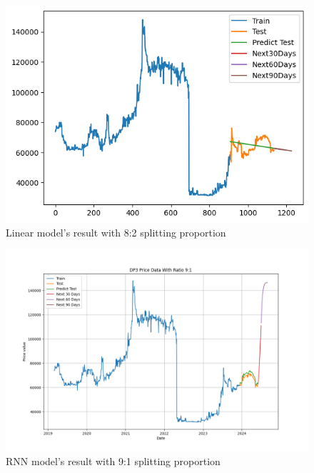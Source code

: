 \documentclass{ieeeojies}
\begin{document}
\begin{figure}[H]
  \centering
  \begin{minipage}{0.8\linewidth}
    \centering
    \includegraphics[width=\linewidth]{bibliography/Figure/LN_DP3(8_2).png}
    \caption{Linear model's result with 8:2 splitting proportion}
    \label{fig8}
  \end{minipage}
\end{figure}

\begin{figure}[H]
  \centering
  \begin{minipage}{0.8\linewidth}
    \centering
    \includegraphics[width=\linewidth]{bibliography/Figure/RNN_91_DP3.png}
    \caption{RNN model's result with 9:1 splitting proportion}
    \label{fig8}
  \end{minipage}
\end{figure}
\end{document}
